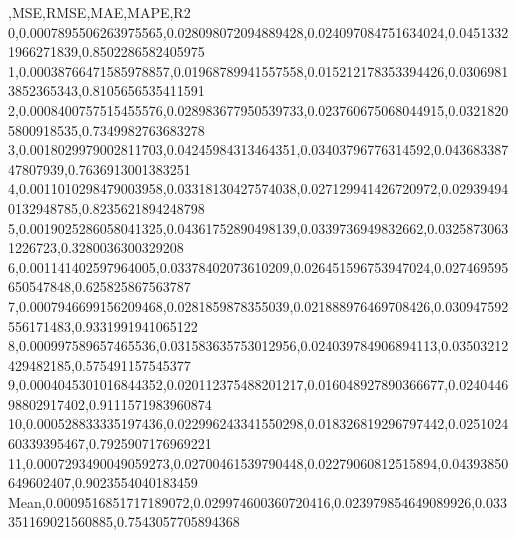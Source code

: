 ,MSE,RMSE,MAE,MAPE,R2
0,0.0007895506263975565,0.028098072094889428,0.024097084751634024,0.04513321966271839,0.8502286582405975
1,0.00038766471585978857,0.01968789941557558,0.015212178353394426,0.03069813852365343,0.8105656535411591
2,0.0008400757515455576,0.028983677950539733,0.023760675068044915,0.03218205800918535,0.7349982763683278
3,0.0018029979002811703,0.04245984313464351,0.03403796776314592,0.04368338747807939,0.7636913001383251
4,0.0011010298479003958,0.03318130427574038,0.027129941426720972,0.029394940132948785,0.8235621894248798
5,0.0019025286058041325,0.04361752890498139,0.0339736949832662,0.03258730631226723,0.3280036300329208
6,0.001141402597964005,0.03378402073610209,0.026451596753947024,0.027469595650547848,0.625825867563787
7,0.0007946699156209468,0.0281859878355039,0.021888976469708426,0.030947592556171483,0.9331991941065122
8,0.000997589657465536,0.031583635753012956,0.024039784906894113,0.03503212429482185,0.575491157545377
9,0.0004045301016844352,0.020112375488201217,0.016048927890366677,0.024044698802917402,0.9111571983960874
10,0.000528833335197436,0.022996243341550298,0.018326819296797442,0.025102460339395467,0.7925907176969221
11,0.0007293490049059273,0.02700461539790448,0.02279060812515894,0.04393850649602407,0.9023554040183459
Mean,0.0009516851717189072,0.029974600360720416,0.023979854649089926,0.033351169021560885,0.7543057705894368
